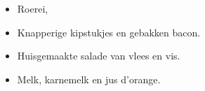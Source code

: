 \begin{itemize}
	\item Roerei,
	\item Knapperige kipstukjes en gebakken bacon.
	\item Huisgemaakte salade van vlees en vis.
	\item Melk, karnemelk en jus d’orange.
\end{itemize}
